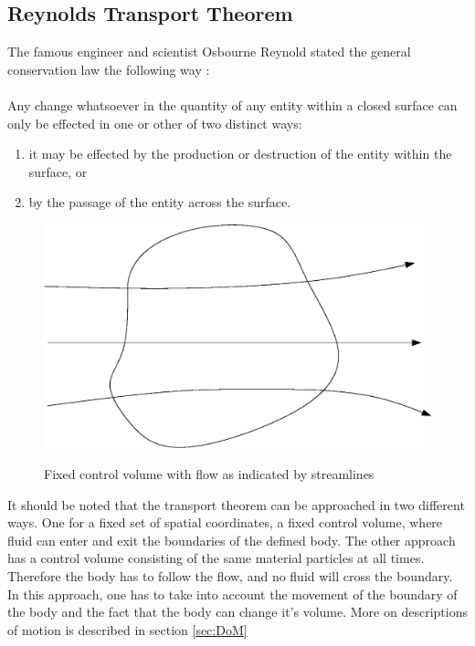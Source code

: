 \subsection{Reynolds Transport Theorem}
The famous engineer and scientist Osbourne Reynold stated the general conservation law the following way \cite{Reyn1903}:
\\
\\
Any change whatsoever in the quantity of any entity within a closed surface can only be effected in one or other of two distinct ways:
\begin{enumerate}
\item it may be effected by the production or destruction of the entity within the surface, or
\item by the passage of the entity across the surface.
\end{enumerate}
\begin{center}
\begin{figure}[!ht]
\includegraphics[scale=0.5]{figures/Fixed_control_volume} \\
\caption{Fixed control volume with flow as indicated by streamlines} 
\end{figure}
\end{center}
It should be noted that the transport theorem can be approached in two different ways. One for a fixed set of spatial coordinates, a fixed control volume, where fluid can enter and exit the boundaries of the defined body. The other approach has a control volume consisting of the same material particles at all times. Therefore the body has to follow the flow, and no fluid will cross the boundary. In this approach, one has to take into account the movement of the boundary of the body and the fact that the body can change it's volume. More on descriptions of motion is described in section \ref{sec:DoM}
